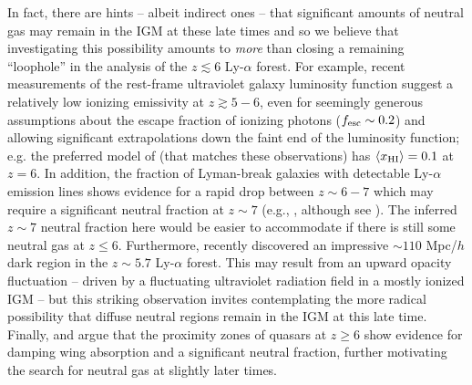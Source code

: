 In fact, there are hints -- albeit indirect ones -- that significant
amounts of neutral gas may remain in the IGM at these late times and so 
we believe that investigating this possibility amounts to {\em more} than closing a remaining ``loophole'' in the analysis
of the $z \lesssim 6$ Ly-$\alpha$ forest. For example, recent measurements of the rest-frame ultraviolet galaxy luminosity function 
suggest a relatively low ionizing emissivity at $z \gtrsim 5-6$, even for seemingly generous assumptions
about the escape fraction of ionizing photons ($f_{\rm esc} \sim 0.2$) and allowing significant extrapolations down the faint end of the luminosity function;  e.g. the preferred model
of \citet{Robertson:2013bq} (that matches these observations) has $\langle x_{\text{HI}}\rangle = 0.1$ at $z=6$. In addition, the fraction of Lyman-break galaxies with detectable Ly-$\alpha$ emission lines shows evidence
for a rapid drop between $z \sim 6-7$ which may require a significant neutral fraction at $z \sim 7$ (e.g., \citealt{2012ApJ...744..179S,Pentericci:2014nia}, although see \citealt{2013MNRAS.429.1695B,Taylor:2013qia}). The inferred $z \sim 7$ neutral fraction here would be easier to accommodate if there is
still some neutral gas at $z \leq 6$.  Furthermore, \citet{Becker:2014oga} recently discovered an impressive $\sim 110$ Mpc/$h$ dark region in the $z \sim 5.7$ Ly-$\alpha$ forest. This may result from an upward opacity fluctuation -- driven by a fluctuating ultraviolet radiation field in a mostly ionized IGM -- but this striking observation invites contemplating the more radical possibility that diffuse neutral regions remain in the IGM at this late time.
Finally, \citet{Mesinger:2006kn} and \citet{2013MNRAS.428.3058S} argue that the proximity zones of quasars at $z \geq 6$ show evidence for damping wing absorption and a significant neutral fraction, further motivating the search for neutral gas at slightly later times.


